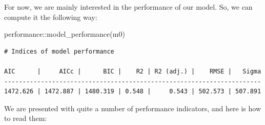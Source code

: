 \documentclass[
  letterpaper,
]{krantz}
\makeatletter
\newenvironment{Shaded}{\begin{snugshade}}{\end{snugshade}}
\newcommand{\FunctionTok}[1]{\textcolor[rgb]{0.28,0.35,0.67}{#1}}
\newcommand{\NormalTok}[1]{\textcolor[rgb]{0.00,0.23,0.31}{#1}}
\newcommand{\SpecialCharTok}[1]{\textcolor[rgb]{0.37,0.37,0.37}{#1}}
\newenvironment{kframe}{%
\medskip{}
\setlength{\fboxsep}{.8em}
 \def\at@end@of@kframe{}%
 \ifinner\ifhmode%
  \def\at@end@of@kframe{\end{minipage}}%
  \begin{minipage}{\columnwidth}%
 \fi\fi%
 \def\FrameCommand##1{\hskip\@totalleftmargin \hskip-\fboxsep
 \colorbox{shadecolor}{##1}\hskip-\fboxsep
     \hskip-\linewidth \hskip-\@totalleftmargin \hskip\columnwidth}%
 \MakeFramed {\advance\hsize-\width
   \@totalleftmargin\z@ \linewidth\hsize
   \@setminipage}}%
 {\par\unskip\endMakeFramed%
 \at@end@of@kframe}
\renewenvironment{Shaded}{\begin{kframe}}{\end{kframe}}
\makeatother
\begin{document}
For now, we are mainly interested in the performance of our model. So,
we can compute it the following way:

\begin{Shaded}
\begin{Highlighting}[]
\NormalTok{performance}\SpecialCharTok{::}\FunctionTok{model\_performance}\NormalTok{(m0)}
\end{Highlighting}
\end{Shaded}

\begin{verbatim}
# Indices of model performance

AIC      |     AICc |      BIC |    R2 | R2 (adj.) |    RMSE |   Sigma
----------------------------------------------------------------------
1472.626 | 1472.887 | 1480.319 | 0.548 |     0.543 | 502.573 | 507.891
\end{verbatim}

We are presented with quite a number of performance indicators, and here
is how to read them:
\end{document}
